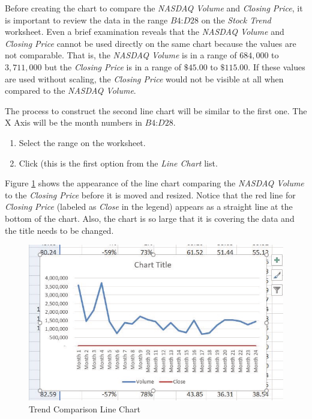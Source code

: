 Before creating the chart to compare the \textit{NASDAQ Volume} and \textit{Closing Price}, it is important to review the data in the range $ B4 $:$ D28 $ on the \textit{Stock Trend} worksheet. Even a brief examination reveals that the \textit{NASDAQ Volume} and \textit{Closing Price} cannot be used directly on the same chart because the values are not comparable. That is, the \textit{NASDAQ Volume} is in a range of $ 684,000 $ to $ 3,711,000 $ but the \textit{Closing Price} is in a range of $ \$45.00 $ to $ \$115.00 $. If these values are used without scaling, the \textit{Closing Price} would not be visible at all when compared to the \textit{NASDAQ Volume}.

The process to construct the second line chart will be similar to the first one. The X Axis will be the month numbers in $ B4 $:$ D28 $.

\begin{enumerate}
	\item Select the range  on the  worksheet.
	\item Click  (this is the first option from the \textit{Line Chart} list.
\end{enumerate}

Figure \ref{04:fig07} shows the appearance of the line chart comparing the \textit{NASDAQ Volume} to the \textit{Closing Price} before it is moved and resized. Notice that the red line for \textit{Closing Price} (labeled as \textit{Close} in the legend) appears as a straight line at the bottom of the chart. Also, the chart is so large that it is covering the data and the title needs to be changed.

\begin{figure}[H]
	\centering
	\includegraphics[width=\maxwidth{.95\linewidth}]{gfx/ch04_fig07}
	\caption{Trend Comparison Line Chart}
	\label{04:fig07}
\end{figure}

